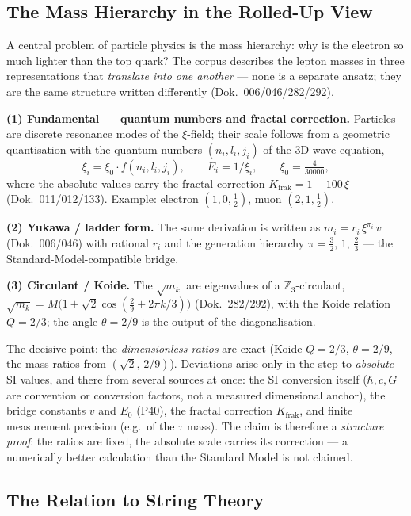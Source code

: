 \documentclass[11pt,a4paper]{article}
\begin{document}
\subsection{The Mass Hierarchy in the Rolled-Up View}

A central problem of particle physics is the mass hierarchy: why is the electron so much lighter than the top quark? The corpus describes the lepton masses in three representations that \emph{translate into one another} --- none is a separate ansatz; they are the same structure written differently (Dok.~006/046/282/292).

\textbf{(1) Fundamental --- quantum numbers and fractal correction.} Particles are discrete resonance modes of the $\xi$-field; their scale follows from a geometric quantisation with the quantum numbers $(n_i,l_i,j_i)$ of the 3D wave equation,
\[
  \xi_i = \xi_0\cdot f(n_i,l_i,j_i),\qquad E_i = 1/\xi_i,\qquad \xi_0=\tfrac{4}{30000},
\]
where the absolute values carry the fractal correction $K_{\text{frak}}=1-100\,\xi$ (Dok.~011/012/133). Example: electron $(1,0,\tfrac12)$, muon $(2,1,\tfrac12)$.

\textbf{(2) Yukawa / ladder form.} The same derivation is written as $m_i = r_i\,\xi^{\pi_i}\,v$ (Dok.~006/046) with rational $r_i$ and the generation hierarchy $\pi=\tfrac32,\,1,\,\tfrac23$ --- the Standard-Model-compatible bridge.

\textbf{(3) Circulant / Koide.} The $\sqrt{m_k}$ are eigenvalues of a $\mathbb{Z}_3$-circulant, $\sqrt{m_k}=M\bigl(1+\sqrt2\cos(\tfrac29+2\pi k/3)\bigr)$ (Dok.~282/292), with the Koide relation $Q=2/3$; the angle $\theta=2/9$ is the output of the diagonalisation.

The decisive point: the \emph{dimensionless ratios} are exact (Koide $Q=2/3$, $\theta=2/9$, the mass ratios from $(\sqrt2,\,2/9)$). Deviations arise only in the step to \emph{absolute} SI values, and there from several sources at once: the SI conversion itself ($\hbar,c,G$ are convention or conversion factors, not a measured dimensional anchor), the bridge constants $v$ and $E_0$ (P40), the fractal correction $K_{\text{frak}}$, and finite measurement precision (e.g.\ of the $\tau$ mass). The claim is therefore a \emph{structure proof}: the ratios are fixed, the absolute scale carries its correction --- a numerically better calculation than the Standard Model is not claimed.

\subsection{The Relation to String Theory}
\end{document}
